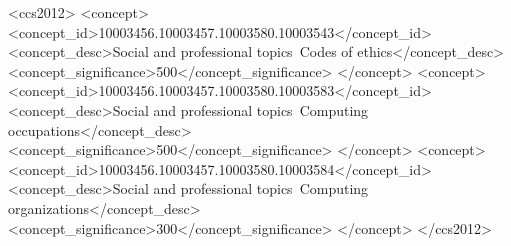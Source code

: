 \documentclass[acmsmall]{acmart}
\begin{document}
\begin{CCSXML}
<ccs2012>
<concept>
<concept_id>10003456.10003457.10003580.10003543</concept_id>
<concept_desc>Social and professional topics~Codes of ethics</concept_desc>
<concept_significance>500</concept_significance>
</concept>
<concept>
<concept_id>10003456.10003457.10003580.10003583</concept_id>
<concept_desc>Social and professional topics~Computing occupations</concept_desc>
<concept_significance>500</concept_significance>
</concept>
<concept>
<concept_id>10003456.10003457.10003580.10003584</concept_id>
<concept_desc>Social and professional topics~Computing organizations</concept_desc>
<concept_significance>300</concept_significance>
</concept>
</ccs2012>
\end{CCSXML}




\maketitle

%
%
%
%
%
%
\end{document}
